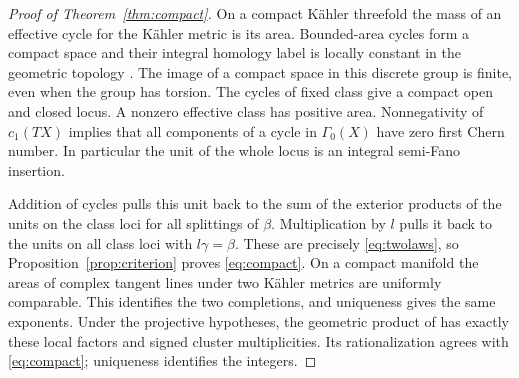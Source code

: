 \begin{proof}[Proof of Theorem~\ref{thm:compact}]
On a compact Kähler threefold the mass of an effective cycle for the
Kähler metric is its area. Bounded-area cycles form a compact space
and their integral homology label is locally constant in the geometric
topology \cite[Theorem~2.11 and Remark~2.13]{DIW}. The image of a
compact space in this discrete group is finite, even when the group has
torsion. The cycles of fixed class give a compact open and closed
locus. A nonzero effective class has positive area. Nonnegativity of
$c_1(TX)$ implies that all components of a cycle in $\Gamma_0(X)$
have zero first Chern number. In particular the unit of the whole
locus is an integral semi-Fano insertion.

Addition of cycles pulls this unit back to the sum of the exterior
products of the units on the class loci for all splittings of $\beta$.
Multiplication by $l$ pulls it back to the units on all class loci
with $l\gamma=\beta$. These are precisely \eqref{eq:twolaws}, so
Proposition~\ref{prop:criterion} proves \eqref{eq:compact}. On a compact
manifold the areas of complex tangent lines under two Kähler metrics
are uniformly comparable. This identifies the two completions, and
uniqueness gives the same exponents. Under the projective hypotheses,
the geometric product of \cite[Theorem~1.1]{WueProduct} has exactly these
local factors and signed cluster multiplicities. Its rationalization
agrees with \eqref{eq:compact}; uniqueness identifies the integers.
\end{proof}
